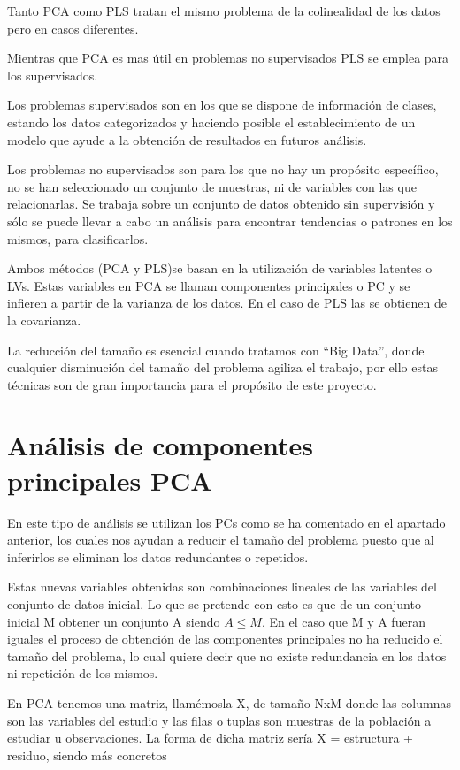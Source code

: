 Tanto PCA como PLS tratan el mismo problema de la colinealidad de los datos pero en casos diferentes.
\bigskip

Mientras que PCA es mas útil en problemas no supervisados PLS se emplea para los supervisados.
\bigskip
 
Los problemas supervisados son en los que se dispone de información de clases, estando los datos categorizados y haciendo posible el establecimiento de un modelo que ayude a la obtención de resultados en futuros análisis.
\bigskip

Los problemas no supervisados son para los que no hay un propósito específico, no se han seleccionado un conjunto de muestras, ni de variables con las que relacionarlas. Se trabaja sobre un conjunto de datos obtenido sin supervisión y sólo se puede llevar a cabo un análisis para encontrar tendencias o patrones en los mismos, para clasificarlos.
\bigskip

Ambos métodos (PCA y PLS)se basan en la utilización de variables latentes o LVs. Estas variables en PCA se llaman componentes principales o PC y se infieren a partir de la varianza de los datos. En el caso de PLS las se obtienen de la covarianza. 
\bigskip

La reducción del tamaño es esencial cuando tratamos con “Big Data”, donde  cualquier disminución del tamaño del problema agiliza el trabajo, por ello estas técnicas son de gran importancia para el propósito de este proyecto.
\bigskip


\section{Análisis de componentes principales PCA} \cite{EKE} \cite{JMMD}

En este tipo de análisis se utilizan los PCs como se ha comentado en el apartado anterior, los cuales nos ayudan a reducir el tamaño del problema puesto que al inferirlos se eliminan los datos redundantes o repetidos. 
\bigskip

Estas nuevas variables obtenidas son combinaciones lineales de las variables del conjunto de datos inicial. Lo que se pretende con esto es que de un conjunto inicial M  obtener un conjunto A siendo $ A \leq M $. En el caso que M y A fueran iguales el proceso de obtención de las componentes principales no ha reducido el tamaño del problema, lo cual quiere decir que no existe redundancia en los datos ni repetición de los mismos.
\bigskip

En PCA tenemos una matriz, llamémosla X, de tamaño NxM donde las columnas son las variables del estudio y las filas o tuplas son muestras de la población a estudiar u observaciones. La forma de dicha matriz sería X = estructura + residuo, siendo más concretos 

